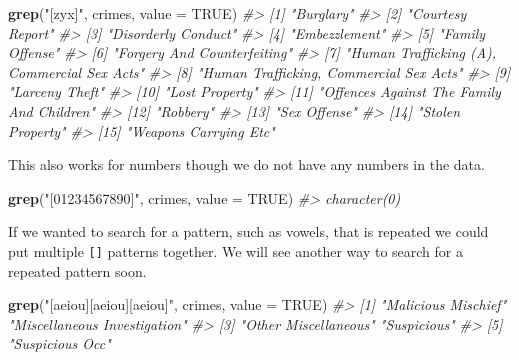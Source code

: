 \documentclass[
  12pt,
]{book}
\newenvironment{Shaded}{\begin{snugshade}}{\end{snugshade}}
\newcommand{\CommentTok}[1]{\textcolor[rgb]{0.37,0.37,0.37}{\textit{#1}}}
\newcommand{\DataTypeTok}[1]{\textcolor[rgb]{0.27,0.27,0.27}{#1}}
\newcommand{\KeywordTok}[1]{\textcolor[rgb]{0.27,0.27,0.27}{\textbf{#1}}}
\newcommand{\NormalTok}[1]{#1}
\newcommand{\OtherTok}[1]{\textcolor[rgb]{0.37,0.37,0.37}{#1}}
\newcommand{\StringTok}[1]{\textcolor[rgb]{0.5,0.5,0.5}{#1}}
\begin{document}
\begin{Shaded}
\begin{Highlighting}[]
\KeywordTok{grep}\NormalTok{(}\StringTok{"[zyx]"}\NormalTok{, crimes, }\DataTypeTok{value =} \OtherTok{TRUE}\NormalTok{)}
\CommentTok{\#\textgreater{}  [1] "Burglary"                                  }
\CommentTok{\#\textgreater{}  [2] "Courtesy Report"                           }
\CommentTok{\#\textgreater{}  [3] "Disorderly Conduct"                        }
\CommentTok{\#\textgreater{}  [4] "Embezzlement"                              }
\CommentTok{\#\textgreater{}  [5] "Family Offense"                            }
\CommentTok{\#\textgreater{}  [6] "Forgery And Counterfeiting"                }
\CommentTok{\#\textgreater{}  [7] "Human Trafficking (A), Commercial Sex Acts"}
\CommentTok{\#\textgreater{}  [8] "Human Trafficking, Commercial Sex Acts"    }
\CommentTok{\#\textgreater{}  [9] "Larceny Theft"                             }
\CommentTok{\#\textgreater{} [10] "Lost Property"                             }
\CommentTok{\#\textgreater{} [11] "Offences Against The Family And Children"  }
\CommentTok{\#\textgreater{} [12] "Robbery"                                   }
\CommentTok{\#\textgreater{} [13] "Sex Offense"                               }
\CommentTok{\#\textgreater{} [14] "Stolen Property"                           }
\CommentTok{\#\textgreater{} [15] "Weapons Carrying Etc"}
\end{Highlighting}
\end{Shaded}

This also works for numbers though we do not have any numbers in the data.

\begin{Shaded}
\begin{Highlighting}[]
\KeywordTok{grep}\NormalTok{(}\StringTok{"[01234567890]"}\NormalTok{, crimes, }\DataTypeTok{value =} \OtherTok{TRUE}\NormalTok{)}
\CommentTok{\#\textgreater{} character(0)}
\end{Highlighting}
\end{Shaded}

If we wanted to search for a pattern, such as vowels, that is repeated we could put multiple \texttt{{[}{]}} patterns together. We will see another way to search for a repeated pattern soon.

\begin{Shaded}
\begin{Highlighting}[]
\KeywordTok{grep}\NormalTok{(}\StringTok{"[aeiou][aeiou][aeiou]"}\NormalTok{, crimes, }\DataTypeTok{value =} \OtherTok{TRUE}\NormalTok{)}
\CommentTok{\#\textgreater{} [1] "Malicious Mischief"          "Miscellaneous Investigation"}
\CommentTok{\#\textgreater{} [3] "Other Miscellaneous"         "Suspicious"                 }
\CommentTok{\#\textgreater{} [5] "Suspicious Occ"}
\end{Highlighting}
\end{Shaded}
\end{document}

